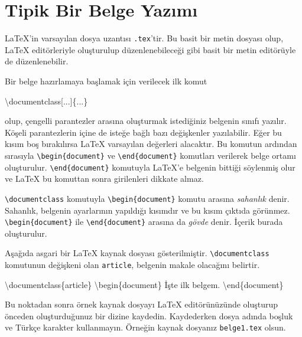 \documentclass[
  10pt,
]{scrbook}
\newenvironment{Shaded}{\begin{snugshade}}{\end{snugshade}}
\newcommand{\NormalTok}[1]{#1}
\begin{document}
\hypertarget{tipik}{%
\section{Tipik Bir Belge Yazımı}\label{tipik}}

LaTeX'in varsayılan dosya uzantısı \texttt{.tex}'tir. Bu basit bir metin
dosyası olup, LaTeX editörleriyle oluşturulup düzenlenebileceği gibi
basit bir metin editörüyle de düzenlenebilir.

Bir belge hazırlamaya başlamak için verilecek ilk komut

\begin{Shaded}
\begin{Highlighting}[]
\NormalTok{\textbackslash{}documentclass[...]\{...\}}
\end{Highlighting}
\end{Shaded}

olup, çengelli parantezler arasına oluşturmak istediğiniz belgenin
sınıfı yazılır. Köşeli parantezlerin içine de isteğe bağlı bazı
değişkenler yazılabilir. Eğer bu kısım boş bırakılırsa LaTeX varsayılan
değerleri alacaktır. Bu komutun ardından sırasıyla \texttt{\textbackslash{}begin\{document\}} ve
\texttt{\textbackslash{}end\{document\}} komutları verilerek belge ortamı oluşturulur.
\texttt{\textbackslash{}end\{document\}} komutuyla LaTeX'e belgenin bittiği söylenmiş olur ve
LaTeX bu komuttan sonra girilenleri dikkate almaz.

\texttt{\textbackslash{}documentclass} komutuyla \texttt{\textbackslash{}begin\{document\}} komutu arasına \emph{sahanlık}
denir. Sahanlık, belgenin ayarlarının yapıldığı kısımdır ve bu kısım
çıktıda görünmez. \texttt{\textbackslash{}begin\{document\}} ile \texttt{\textbackslash{}end\{document\}} arasına da
\emph{gövde} denir. İçerik burada oluşturulur.

Aşağıda asgari bir LaTeX kaynak dosyası gösterilmiştir. \texttt{\textbackslash{}documentclass}
komutunun değişkeni olan \texttt{article}, belgenin makale olacağını belirtir.

\begin{Shaded}
\begin{Highlighting}[]
\NormalTok{\textbackslash{}documentclass\{article\}}
\NormalTok{\textbackslash{}begin\{document\}}
\NormalTok{İşte ilk belgem.}
\NormalTok{\textbackslash{}end\{document\}}
\end{Highlighting}
\end{Shaded}

Bu noktadan sonra örnek kaynak dosyayı LaTeX editörünüzünde oluşturup
önceden oluşturduğunuz bir dizine kaydedin. Kaydederken dosya adında
boşluk ve Türkçe karakter kullanmayın. Örneğin kaynak dosyanız
\texttt{belge1.tex} olsun.
\end{document}
